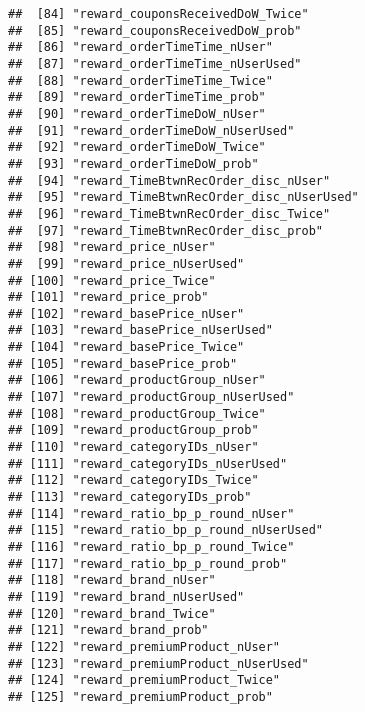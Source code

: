 \documentclass[10pt]{report}
\begin{document}
\begin{verbatim}
##  [84] "reward_couponsReceivedDoW_Twice"                    
##  [85] "reward_couponsReceivedDoW_prob"                     
##  [86] "reward_orderTimeTime_nUser"                         
##  [87] "reward_orderTimeTime_nUserUsed"                     
##  [88] "reward_orderTimeTime_Twice"                         
##  [89] "reward_orderTimeTime_prob"                          
##  [90] "reward_orderTimeDoW_nUser"                          
##  [91] "reward_orderTimeDoW_nUserUsed"                      
##  [92] "reward_orderTimeDoW_Twice"                          
##  [93] "reward_orderTimeDoW_prob"                           
##  [94] "reward_TimeBtwnRecOrder_disc_nUser"                 
##  [95] "reward_TimeBtwnRecOrder_disc_nUserUsed"             
##  [96] "reward_TimeBtwnRecOrder_disc_Twice"                 
##  [97] "reward_TimeBtwnRecOrder_disc_prob"                  
##  [98] "reward_price_nUser"                                 
##  [99] "reward_price_nUserUsed"                             
## [100] "reward_price_Twice"                                 
## [101] "reward_price_prob"                                  
## [102] "reward_basePrice_nUser"                             
## [103] "reward_basePrice_nUserUsed"                         
## [104] "reward_basePrice_Twice"                             
## [105] "reward_basePrice_prob"                              
## [106] "reward_productGroup_nUser"                          
## [107] "reward_productGroup_nUserUsed"                      
## [108] "reward_productGroup_Twice"                          
## [109] "reward_productGroup_prob"                           
## [110] "reward_categoryIDs_nUser"                           
## [111] "reward_categoryIDs_nUserUsed"                       
## [112] "reward_categoryIDs_Twice"                           
## [113] "reward_categoryIDs_prob"                            
## [114] "reward_ratio_bp_p_round_nUser"                      
## [115] "reward_ratio_bp_p_round_nUserUsed"                  
## [116] "reward_ratio_bp_p_round_Twice"                      
## [117] "reward_ratio_bp_p_round_prob"                       
## [118] "reward_brand_nUser"                                 
## [119] "reward_brand_nUserUsed"                             
## [120] "reward_brand_Twice"                                 
## [121] "reward_brand_prob"                                  
## [122] "reward_premiumProduct_nUser"                        
## [123] "reward_premiumProduct_nUserUsed"                    
## [124] "reward_premiumProduct_Twice"                        
## [125] "reward_premiumProduct_prob"                         

\end{verbatim}
\end{document}
